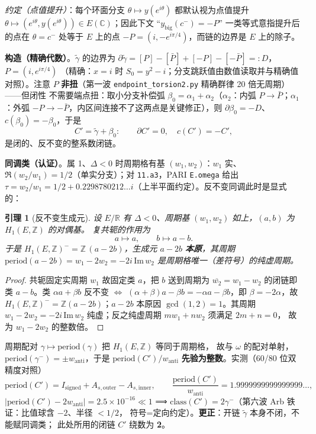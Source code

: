 \documentclass[11pt,a4paper]{ctexart}
\newtheorem{lemma}[theorem]{引理}
\theoremstyle{remark}
\newcommand{\ZZ}{\mathbb{Z}}
\newcommand{\RR}{\mathbb{R}}
\newcommand{\CC}{\mathbb{C}}
\begin{document}
\emph{约定（点值提升）}：每个环面分支 $\theta\mapsto y(e^{i\theta})$ 都默认视为点值提升
$\theta\mapsto(e^{i\theta},y(e^{i\theta}))\in E(\CC)$；因此下文
``$y_{\mathrm{big}}(c^-)=-P$'' 一类等式意指提升后的点在 $\theta=c^-$ 处等于 $E$ 上的点
$-P=(i,-e^{i\pi/4})$，而链的边界是 $E$ 上的除子。

\textbf{构造（精确代数）}。$\tilde\gamma$ 的边界为
$\partial\tilde\gamma=[P]-[\bar P]+[-P]-[-\bar P]=:D$，$P=(i,e^{i\pi/4})$
（精确：$x=i$ 时 $S_0=y^2-i$；分支跳跃值由数值读取并与精确值对照）。注意 $P$
\textbf{非扭}（第一波 \texttt{endpoint\_torsion2.py} 精确群律 20 倍无周期）——但闭性
不需要端点扭：取小分支补偿弧 $\beta_0=\alpha_1+\alpha_2$（$\alpha_2$：内弧
$P\to\bar P$；$\alpha_1$：外弧 $-P\to-\bar P$，内区间连接不了这两点是关键修正），则
$\partial\beta_0=-D$、$c(\beta_0)=-\beta_0$，于是
\[
C'=\tilde\gamma+\beta_0:\qquad \partial C'=0,\quad c(C')=-C',
\]
是闭的、反不变的整系数闭链。

\textbf{同调类（认证）}。属 1、$\Delta<0$ 时周期格有基 $(w_1,w_2)$：$w_1$ 实、
$\Re(w_2/w_1)=1/2$（单实分支）；对 \texttt{11.a3}，PARI \texttt{E.omega} 给出
$\tau=w_2/w_1=1/2+0.2298780212\ldots i$（上半平面约定）。反不变同调此时是显式的：

\begin{lemma}[反不变生成元]\label{lem:antiinv}
设 $E/\RR$ 有 $\Delta<0$、周期基 $(w_1,w_2)$ 如上，$(a,b)$ 为 $H_1(E,\ZZ)$ 的对偶基。
复共轭的作用为
\[
a\mapsto a,\qquad b\mapsto a-b.
\]
于是 $H_1(E,\ZZ)^-=\ZZ\,(a-2b)$，生成元 $a-2b$ \textbf{本原}，其周期
$\mathrm{period}(a-2b)=w_1-2w_2=-2i\,\mathrm{Im}\,w_2$ 是周期格唯一（差符号）的纯虚周期。
\end{lemma}

\begin{proof}
共轭固定实周期 $w_1$ 故固定类 $a$，把 $b$ 送到周期为 $\overline{w_2}=w_1-w_2$ 的闭链即类
$a-b$。类 $\alpha a+\beta b$ 反不变 $\Longleftrightarrow$
$(\alpha+\beta)a-\beta b=-\alpha a-\beta b$，即 $\beta=-2\alpha$，故
$H_1(E,\ZZ)^-=\ZZ(a-2b)$；$a-2b$ 本原因 $\gcd(1,2)=1$。其周期
$w_1-2w_2=-2i\,\mathrm{Im}\,w_2$ 纯虚；反之纯虚周期 $mw_1+nw_2$ 须满足 $2m+n=0$，
故为 $w_1-2w_2$ 的整数倍。
\end{proof}

周期配对 $\gamma\mapsto\mathrm{period}(\gamma)$ 把 $H_1(E,\ZZ)$ 等同于周期格，
故与 $\omega$ 的配对单射，$\mathrm{period}(\gamma^-)=\pm w_{\mathrm{anti}}$，于是
$\mathrm{period}(C')/w_{\mathrm{anti}}$ \textbf{先验为整数}。实测（60/80 位双精度对照）
\[
\mathrm{period}(C')=I_{\mathrm{signed}}+A_{s,\mathrm{outer}}-A_{s,\mathrm{inner}},\qquad
\frac{\mathrm{period}(C')}{w_{\mathrm{anti}}}=1.9999999999999999\ldots,
\]
$|\mathrm{period}(C')-2w_{\mathrm{anti}}|=2.5\times10^{-16}\ll 1$ ⟹
$\mathrm{class}(C')=2\gamma^-$（第六波 Arb 铁证：比值球含 $-2$、半径 $<1/2$，
符号=定向约定）。\textbf{更正}：开链 $\tilde\gamma$ 本身不闭，不能赋同调类；
此处所用的闭链 $C'$ 绕数为 \textbf{2}。
\end{document}
